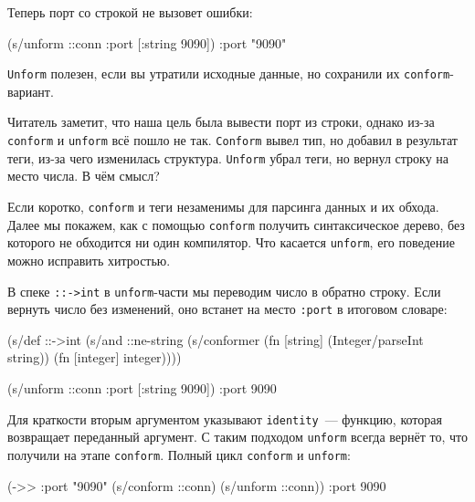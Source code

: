 \noindent
Теперь порт со строкой не вызовет ошибки:

\begin{english}
  \begin{clojure}
(s/unform ::conn {:port [:string 9090]})
{:port "9090"}
  \end{clojure}
\end{english}

\verb|Unform| полезен, если вы утратили исходные данные, но сохранили их
\verb|conform|-вариант.

Читатель заметит, что наша цель была вывести порт из строки, однако из-за
\verb|conform| и \verb|unform| всё пошло не так. \verb|Conform| вывел тип,
но добавил в результат теги, из-за чего изменилась структура. \verb|Unform|
убрал теги, но вернул строку на место числа. В чём смысл?

Если коротко, \verb|conform| и теги незаменимы для парсинга данных и их
обхода. Далее мы покажем, как с помощью \verb|conform| получить синтаксическое
дерево, без которого не обходится ни один компилятор. Что касается
\verb|unform|, его поведение можно исправить хитростью.

В спеке \verb|::->int| в \verb|unform|-части мы переводим число в обратно
строку. Если вернуть число без изменений, оно встанет на место \verb|:port| в
итоговом словаре:

\begin{english}
  \begin{clojure}
(s/def ::->int
  (s/and
   ::ne-string
   (s/conformer
    (fn [string]
      (Integer/parseInt string))
    (fn [integer]
      integer))))

(s/unform ::conn {:port [:string 9090]})
{:port 9090}
  \end{clojure}
\end{english}


Для краткости вторым аргументом указывают \verb|identity|~--- функцию, которая
возвращает переданный аргумент. С таким подходом \verb|unform| всегда
вернёт то, что получили на этапе \verb|conform|. Полный цикл
\verb|conform| и \verb|unform|:

\begin{english}
  \begin{clojure}
(->> {:port "9090"}
     (s/conform ::conn)
     (s/unform ::conn))
{:port 9090}
  \end{clojure}
\end{english}

